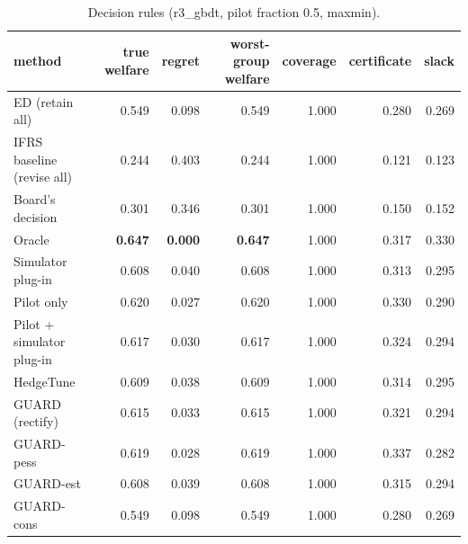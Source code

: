 \begin{table}[t]
\centering
\small
\begin{tabular}{lrrrrrr}
\toprule
method & true welfare & regret & worst-group welfare & coverage & certificate & slack \\
\midrule
ED (retain all) & 0.549 & 0.098 & 0.549 & 1.000 & 0.280 & 0.269 \\
IFRS baseline (revise all) & 0.244 & 0.403 & 0.244 & 1.000 & 0.121 & 0.123 \\
Board's decision & 0.301 & 0.346 & 0.301 & 1.000 & 0.150 & 0.152 \\
Oracle & \textbf{0.647} & \textbf{0.000} & \textbf{0.647} & 1.000 & 0.317 & 0.330 \\
Simulator plug-in & 0.608 & 0.040 & 0.608 & 1.000 & 0.313 & 0.295 \\
Pilot only & 0.620 & 0.027 & 0.620 & 1.000 & 0.330 & 0.290 \\
Pilot + simulator plug-in & 0.617 & 0.030 & 0.617 & 1.000 & 0.324 & 0.294 \\
HedgeTune & 0.609 & 0.038 & 0.609 & 1.000 & 0.314 & 0.295 \\
GUARD (rectify) & 0.615 & 0.033 & 0.615 & 1.000 & 0.321 & 0.294 \\
GUARD-pess & 0.619 & 0.028 & 0.619 & 1.000 & 0.337 & 0.282 \\
GUARD-est & 0.608 & 0.039 & 0.608 & 1.000 & 0.315 & 0.294 \\
GUARD-cons & 0.549 & 0.098 & 0.549 & 1.000 & 0.280 & 0.269 \\
\bottomrule
\end{tabular}
\caption{Decision rules (r3\_gbdt, pilot fraction 0.5, maxmin).}
\label{tab:methods-maxmin}
\end{table}

